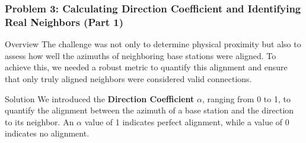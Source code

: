 \begin{frame}
    \frametitle{Problem 3: Calculating Direction Coefficient and Identifying Real Neighbors (Part 1)}

    \begin{block}{Overview}
        The challenge was not only to determine physical proximity but also to assess how well the azimuths of neighboring base stations were aligned. To achieve this, we needed a robust metric to quantify this alignment and ensure that only truly aligned neighbors were considered valid connections.
    \end{block}

    \begin{block}{Solution}
        We introduced the \textbf{Direction Coefficient} \( \alpha \), ranging from 0 to 1, to quantify the alignment between the azimuth of a base station and the direction to its neighbor. An \( \alpha \) value of 1 indicates perfect alignment, while a value of 0 indicates no alignment.
    \end{block}
\end{frame}

